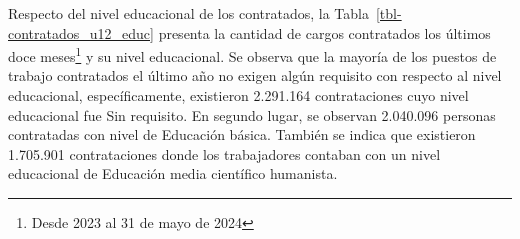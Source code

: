 \documentclass[
  11pt,
]{article}
\begin{document}
\FloatBarrier

\begin{table}

\caption{\label{tbl-contratados_sector}Contratados últimos 12 meses por
sector de actividad económica.}


\end{table}%

Respecto del nivel educacional de los contratados, la
Tabla~\ref{tbl-contratados_u12_educ} presenta la cantidad de cargos
contratados los últimos doce meses\footnote{Desde 2023 al 31 de mayo de
  2024} y su nivel educacional. Se observa que la mayoría de los puestos
de trabajo contratados el último año no exigen algún requisito con
respecto al nivel educacional, específicamente, existieron 2.291.164
contrataciones cuyo nivel educacional fue Sin requisito. En segundo
lugar, se observan 2.040.096 personas contratadas con nivel de Educación
básica. También se indica que existieron 1.705.901 contrataciones donde
los trabajadores contaban con un nivel educacional de Educación media
científico humanista.
\end{document}
